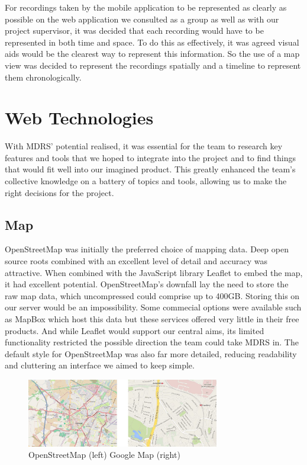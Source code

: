 \documentclass{l3proj}
\begin{document}
For recordings taken by the mobile application to be represented as clearly as possible on the web application we consulted as a group as well as with our project supervisor, it was decided that each recording would have to be represented in both time and space. To do this as effectively, it was agreed visual aids would be the clearest way to represent this information. So the use of a map view was decided to represent the recordings spatially and a timeline to represent them chronologically.

\section{Web Technologies}

With MDRS' potential realised, it was essential for the team to research key features and tools that we hoped to integrate into the project and to find things that would fit well into our imagined product. This greatly enhanced the team's collective knowledge on a battery of topics and tools, allowing us to make the right decisions for the project.

\subsection{Map}

OpenStreetMap\cite{openStreetMap} was initially the preferred choice of mapping data. Deep open source roots combined with an excellent level of detail and accuracy was attractive. When combined with the \gls{JavaScript} library \gls{Leaflet} to embed the map, it had excellent potential. OpenStreetMap's downfall lay the need to store the raw map data, which uncompressed could comprise up to 400GB. Storing this on our server would be an impossibility. Some commecial options were available such as MapBox which host this data but these services offered very little in their free products. And while Leaflet would support our central aims, its limited functionality restricted the possible direction the team could take MDRS in. The default style for OpenStreetMap was also far more detailed, reducing readability and cluttering an interface we aimed to keep simple.

\begin{figure}[ht!]
  \centering
\includegraphics[width=0.75\textwidth]{images/openstreetmap_google-map.jpg}
\caption{OpenStreetMap (left) Google Map (right)}
\end{figure}
\end{document}

